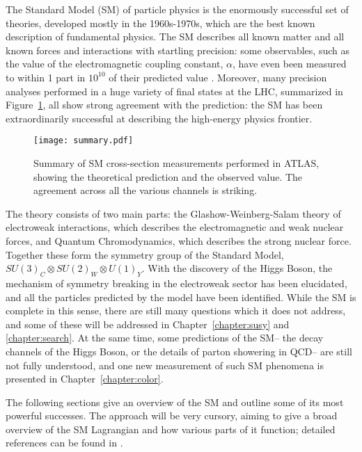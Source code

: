 \label{chapter:sm}

The Standard Model (SM) of particle physics is the enormously successful set of theories, developed mostly in the 1960s-1970s, which are the best known description of fundamental physics. The SM describes all known matter and all known forces and interactions with startling precision: some observables, such as the value of the electromagnetic coupling constant, $\alpha$, have even been measured to within 1 part in $10^{10}$ of their predicted value . Moreover, many precision analyses performed in a huge variety of final states at the LHC, summarized in Figure~\ref{fig:sm:summary}, all show strong agreement with the prediction: the SM has been extraordinarily successful at describing the high-energy physics frontier.


\begin{figure}
\centering
\texttt{[image: summary.pdf]}
\label{fig:sm:summary}
\caption{Summary of SM cross-section measurements performed in ATLAS, showing the theoretical prediction and the observed value. The agreement across all the various channels is striking.}
\end{figure}


The theory consists of two main parts: the Glashow-Weinberg-Salam theory of electroweak interactions, which describes the electromagnetic and weak nuclear forces, and Quantum Chromodynamics, which describes the strong nuclear force. Together these form the symmetry group of the Standard Model, $SU(3)_C \otimes SU(2)_W \otimes U(1)_Y$. With the discovery of the Higgs Boson, the mechanism of symmetry breaking in the electroweak sector has been elucidated, and all the particles predicted by the model have been identified. While the SM is complete in this sense, there are still many questions which it does not address, and some of these will be addressed in Chapter~\ref{chapter:susy} and \ref{chapter:search}. At the same time, some predictions of the SM-- the decay channels of the Higgs Boson, or the details of parton showering in QCD-- are still not fully understood, and one new measurement of such SM phenomena is presented in Chapter~\ref{chapter:color}.

The following sections give an overview of the SM and outline some of its most powerful successes. The approach will be very cursory, aiming to give a broad overview of the SM Lagrangian and how various parts of it function; detailed references can be found in \cite{schwartz,2006physics11219P}. 



